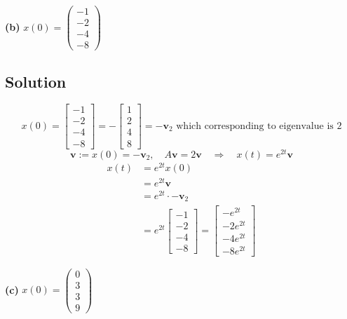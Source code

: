 \documentclass[12pt,a4paper]{article}
\begin{document}
\textbf{(b)} $x(0)=\begin{pmatrix}-1\\-2\\-4\\-8\end{pmatrix}$
\subsection*{Solution}

\[
x(0) = \begin{bmatrix}
	-1 \\ -2 \\ -4 \\ -8 
\end{bmatrix} = -\begin{bmatrix}
	1 \\ 2 \\ 4 \\ 8
\end{bmatrix} = -\mathbf v_2 \text{ which corresponding to eigenvalue is } 2
\]
\[
\mathbf v:=x(0)=-\mathbf v_2,\quad A\mathbf v=2\mathbf v\quad\Rightarrow\quad x(t)=e^{2t}\mathbf v
\]
\begin{align*}
	x(t) &= e^{2t} x(0) \\
	&= e^{2t} \mathbf v \\
	&= e^{2t} \cdot - \mathbf v_2 \\
	&= e^{2t} \begin{bmatrix}
		-1 \\ -2 \\ -4 \\ -8 
	\end{bmatrix} = \begin{bmatrix}
	-e^{2t} \\ -2 e^{2t} \\ -4 e^{2t} \\ -8 e^{2t}
	\end{bmatrix}
\end{align*}

\textbf{(c)} $x(0)=\begin{pmatrix}0\\3\\3\\9\end{pmatrix}$
\end{document}
